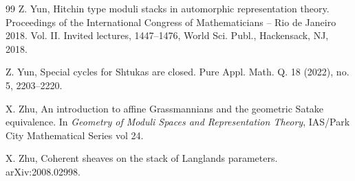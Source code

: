 \begin{thebibliography}{99}
Z. Yun, 
Hitchin type moduli stacks in automorphic representation theory. 
Proceedings of the International Congress of Mathematicians -- Rio de Janeiro 2018. Vol. II. Invited lectures, 1447--1476, World Sci. Publ.,
Hackensack, NJ, 2018.

Z. Yun,
Special cycles for Shtukas are closed.
Pure Appl. Math. Q. 18 (2022), no. 5, 2203--2220.

X. Zhu, 
An introduction to affine Grassmannians and the geometric Satake equivalence.
In {\em Geometry of Moduli Spaces and Representation Theory}, IAS/Park City Mathematical Series vol 24.

X. Zhu,
Coherent sheaves on the stack of Langlands parameters.
arXiv:2008.02998.

\end{thebibliography}
